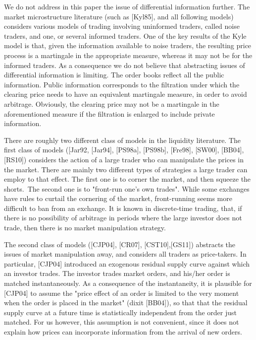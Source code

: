 \documentclass{article}
\begin{document}
We do not address in this paper the issue of differential information
further. The market microstructure literature (such as [Kyl85], and all
following models) considers various models of trading involving uninformed
traders, called noise traders, and one, or several informed traders. One of
the key results of the Kyle model is that, given the information available
to noise traders, the resulting price process is a martingale in the
appropriate measure, whereas it may not be for the informed traders. As a
consequence we do not believe that abstracting issues of differential
information is limiting. The order books reflect all the public information.
Public information corresponds to the filtration under which the clearing
price needs to have an equivalent martingale measure, in order to avoid
arbitrage. Obviously, the clearing price may not be a martingale in the
aforementioned measure if the filtration is enlarged to include private
information.

There are roughly two different class of models in the liquidity literature.
The first class of models ([Jar92, [Jar94], [PS98a], [PS98b], [Fre98],
[SW00], [BB04], [RS10]) considers the action of a large trader who can
manipulate the prices in the market. There are mainly two different types of
strategies a large trader can employ to that effect. The first one is to
corner the market, and then squeeze the shorts.\ The second one is to
"front-run one's own trades". While some exchanges have rules to curtail the
cornering of the market, front-running seems more difficult to ban from an
exchange. It is known in discrete-time trading, that, if there is no
possibility of arbitrage in periods where the large investor does not trade,
then there is no market manipulation strategy.

The second class of models ([CJP04], [CR07], [CST10],[GS11]) abstracts the
issues of market manipulation away, and considers all traders as
price-takers. In particular, [CJP04] introduced an exogenous residual supply
curve against which an investor trades. The investor trades market orders,
and his/her order is matched instantaneously. As a consequence of the
instantaneity, it is plausible for [CJP04] to assume the "price effect of an
order is limited to the very moment when the order is placed in the market"
(dixit [BB04]), so that that the residual supply curve at a future time is
statistically independent from the order just matched. For us however, this
assumption is not convenient, since it does not explain how prices can
incorporate information from the arrival of new orders.
\end{document}
